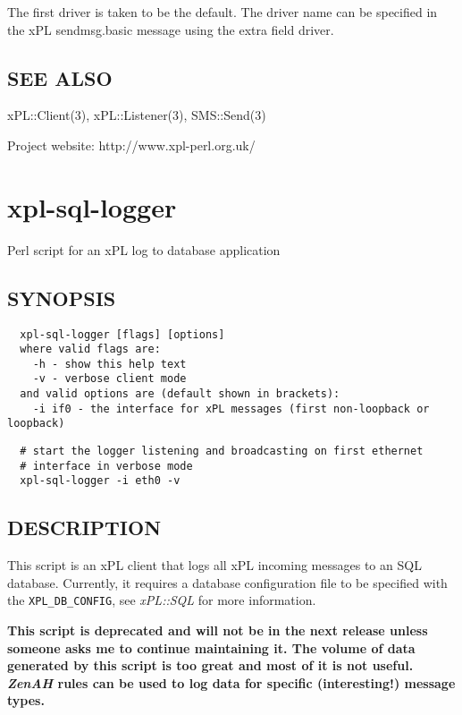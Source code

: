 \documentclass[12pt,a4paper]{article}
\begin{document}
The first driver is taken to be the default.  The driver name can be
specified in the xPL sendmsg.basic message using the extra field
driver.

\subsection*{SEE ALSO\label{xpl-sms-send_SEE_ALSO}}


xPL::Client(3), xPL::Listener(3), SMS::Send(3)



Project website: http://www.xpl-perl.org.uk/

\newpage
\section{xpl-sql-logger\label{xpl-sql-logger}}


Perl script for an xPL log to database application

\subsection*{SYNOPSIS\label{xpl-sql-logger_SYNOPSIS}}
\begin{verbatim}
  xpl-sql-logger [flags] [options]
  where valid flags are:
    -h - show this help text
    -v - verbose client mode
  and valid options are (default shown in brackets):
    -i if0 - the interface for xPL messages (first non-loopback or loopback)
\end{verbatim}
\begin{verbatim}
  # start the logger listening and broadcasting on first ethernet
  # interface in verbose mode
  xpl-sql-logger -i eth0 -v
\end{verbatim}
\subsection*{DESCRIPTION\label{xpl-sql-logger_DESCRIPTION}}


This script is an xPL client that logs all xPL incoming messages to an
SQL database.  Currently, it requires a database configuration file to
be specified with the \texttt{XPL\_DB\_CONFIG}, see \emph{xPL::SQL} for more
information.



\textbf{This script is deprecated and will not be in the next release unless
someone asks me to continue maintaining it.  The volume of data
generated by this script is too great and most of it is not useful.
\emph{ZenAH} rules can be used to log data for specific (interesting!)
message types.}
\end{document}
